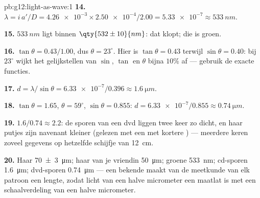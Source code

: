 \begin{solution}{pb:g12:light-as-wave:1}
\textbf{14.} $\lambda = i\,a'/D = \num{4.26e-3} \times
\num{2.50e-4}/2.00 = \num{5.33e-7} \approx \qty{533}{nm}$.

\textbf{15.} $\qty{533}{nm}$ ligt binnen $\qty{532 \pm 10}{nm}$: dat
klopt; die  is groen.

\textbf{16.} $\tan\theta = 0.43/1.00$, dus $\theta = 23^\circ$. Hier is
$\tan\theta = 0.43$ terwijl $\sin\theta = 0.40$: bij $23^\circ$ wijkt het
gelijkstellen van $\sin$, $\tan$ en $\theta$ bijna $10\%$ af --- gebruik
de exacte functies.

\textbf{17.} $d = \lambda/\sin\theta = \num{6.33e-7}/0.396 \approx
\qty{1.6}{\micro m}$.

\textbf{18.} $\tan\theta = 1.65$, $\theta = 59^\circ$,
$\sin\theta = 0.855$: $d = \num{6.33e-7}/0.855 \approx
\qty{0.74}{\micro m}$.

\textbf{19.} $1.6/0.74 \approx 2.2$: de sporen van een dvd liggen twee
keer zo dicht, en haar putjes zijn navenant kleiner (gelezen met een 
met kortere ) --- meerdere keren zoveel gegevens op hetzelfde
schijfje van \qty{12}{cm}.

\textbf{20.} Haar \qty{70 \pm 3}{\micro m}; haar van je vriendin
\qty{50}{\micro m}; groene  \qty{533}{nm}; cd-sporen
\qty{1.6}{\micro m}; dvd-sporen \qty{0.74}{\micro m} --- een bekende
 maakt van de meetkunde van elk patroon een lengte, zodat licht
van een halve micrometer een maatlat is met een schaalverdeling van een
halve micrometer.
\end{solution}

